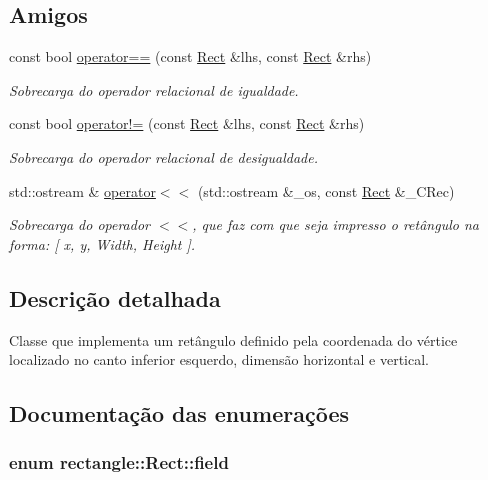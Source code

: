 \subsection*{Amigos}
\begin{DoxyCompactItemize}
\item 
const bool \hyperlink{classrectangle_1_1Rect_a59e0c8f322425fc2cc0c48cb403c4d5e}{operator==} (const \hyperlink{classrectangle_1_1Rect}{Rect} \&lhs, const \hyperlink{classrectangle_1_1Rect}{Rect} \&rhs)
\begin{DoxyCompactList}\small\item\em Sobrecarga do operador relacional de igualdade. \end{DoxyCompactList}\item 
const bool \hyperlink{classrectangle_1_1Rect_a51e713e2232957a74ffa3cab0f41ab47}{operator!=} (const \hyperlink{classrectangle_1_1Rect}{Rect} \&lhs, const \hyperlink{classrectangle_1_1Rect}{Rect} \&rhs)
\begin{DoxyCompactList}\small\item\em Sobrecarga do operador relacional de desigualdade. \end{DoxyCompactList}\item 
std\-::ostream \& \hyperlink{classrectangle_1_1Rect_a2ec7afc82beae7cecb72a829b22e4054}{operator$<$$<$} (std\-::ostream \&\-\_\-os, const \hyperlink{classrectangle_1_1Rect}{Rect} \&\-\_\-\-C\-Rec)
\begin{DoxyCompactList}\small\item\em Sobrecarga do operador $<$$<$, que faz com que seja impresso o ret\^{a}ngulo na forma\-: \mbox{[} x, y, Width, Height \mbox{]}. \end{DoxyCompactList}\end{DoxyCompactItemize}


\subsection{Descrição detalhada}
Classe que implementa um ret\^{a}ngulo definido pela coordenada do v\'{e}rtice localizado no canto inferior esquerdo, dimens\~{a}o horizontal e vertical. 

\subsection{Documentação das enumerações}
\hypertarget{classrectangle_1_1Rect_aadf60e07e4109c5fd25992fa057f8f02}{
\subsubsection[{field}]{\setlength{\rightskip}{0pt plus 5cm}enum {\bf rectangle\-::\-Rect\-::field}}}\label{classrectangle_1_1Rect_aadf60e07e4109c5fd25992fa057f8f02}


